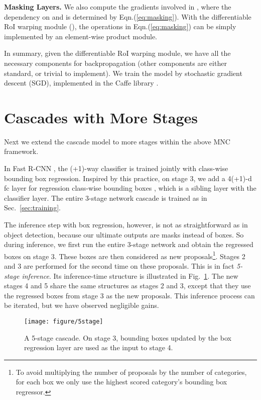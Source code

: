 \documentclass[10pt,twocolumn,letterpaper]{article}
\begin{document}
\vspace{.5em}
\noindent\textbf{Masking Layers.}
We also compute the gradients involved in , where the dependency on  and  is determined by Eqn.(\ref{eq:masking}).
With the differentiable RoI warping module (), the operations in Eqn.(\ref{eq:masking}) can be simply implemented by an element-wise product module.


\vspace{1em}
In summary, given the differentiable RoI warping module, we have all the necessary components for backpropagation (other components are either standard, or trivial to implement). We train the model by stochastic gradient descent (SGD), implemented in the Caffe library \cite{Jia2014}.

\section{Cascades with More Stages}
\label{sec:morestages}

Next we extend the cascade model to more stages within the above MNC framework.

In Fast R-CNN \cite{Girshick2015}, the (+1)-way classifier is trained jointly with class-wise bounding box regression. Inspired by this practice, on stage 3, we add a 4(+1)-d fc layer for regression class-wise bounding boxes \cite{Girshick2015}, which is a sibling layer with the classifier layer. The entire 3-stage network cascade is trained as in Sec.~\ref{sec:training}.

The inference step with box regression, however, is not as straightforward as in object detection, because our ultimate outputs are masks instead of boxes. So during inference, we first run the entire 3-stage network and obtain the regressed boxes on stage 3. These boxes are then considered as new proposals\footnote{To avoid multiplying the number of proposals by the number of categories, for each box we only use the highest scored category's bounding box regressor.}.
Stages 2 and 3 are performed for the second time on these proposals.
This is in fact \emph{5-stage inference}. Its inference-time structure is illustrated in Fig.~\ref{fig:5stage}. The new stages 4 and 5 share the same structures as stages 2 and 3, except that they use the regressed boxes from stage 3 as the new proposals. This inference process can be iterated, but we have observed negligible gains.

\begin{figure}
\begin{center}
\texttt{[image: figure/5stage]}
\end{center}
\vspace{-1em}
\caption{A 5-stage cascade. On stage 3, bounding boxes updated by the box regression layer are used as the input to stage 4.}
\label{fig:5stage}
\end{figure}
\end{document}
